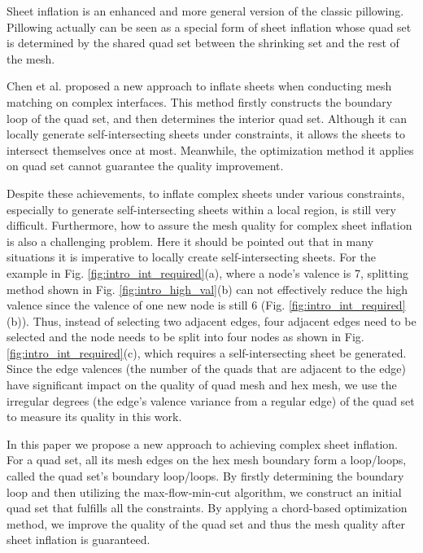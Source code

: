 \documentclass[final,5p,times,twocolumn]{elsarticle}
\begin{document}
Sheet inflation is an enhanced and more general version of the classic pillowing. Pillowing actually can be seen as a special form of sheet inflation whose quad set is determined by the shared quad set between the shrinking set and the rest of the mesh.

Chen et al. proposed a new approach to inflate sheets when conducting mesh matching on complex interfaces\cite{Chen:2015kf}. This method firstly constructs the boundary loop of the quad set, and then determines the interior quad set. Although it can locally generate self-intersecting sheets under constraints, it allows the sheets to intersect themselves once at most. Meanwhile, the optimization method it applies on quad set cannot guarantee the quality improvement.

Despite these achievements, to inflate complex sheets under various constraints, especially to generate self-intersecting sheets within a local region, is still very difficult. Furthermore, how to assure the mesh quality for complex sheet inflation is also a challenging problem. Here it should be pointed out that in many situations it is imperative to locally create self-intersecting sheets. For the example in Fig. \ref{fig:intro_int_required}(a), where a node’s valence is 7, splitting method shown in Fig. \ref{fig:intro_high_val}(b) can not effectively reduce the high valence since the valence of one new node is still 6 (Fig. \ref{fig:intro_int_required}(b)). Thus, instead of selecting two adjacent edges, four adjacent edges need to be selected and the node needs to be split into four nodes as shown in Fig. \ref{fig:intro_int_required}(c), which requires a self-intersecting sheet be generated. Since the edge valences (the number of the quads that are adjacent to the edge) have significant impact on the quality of quad mesh and hex mesh\cite{Staten2010d}, we use the irregular degrees (the edge’s valence variance from a regular edge) of the quad set\cite{Chen:2015kf} to measure its quality in this work.

In this paper we propose a new approach to achieving complex sheet inflation. For a quad set, all its mesh edges on the hex mesh boundary form  a loop/loops, called the quad set’s boundary loop/loops. By firstly determining the boundary loop and then utilizing the max-flow-min-cut algorithm, we construct an initial quad set that fulfills all the constraints. By applying a chord-based optimization method, we improve the quality of the quad set and thus the mesh quality after sheet inflation is guaranteed.
\end{document}
